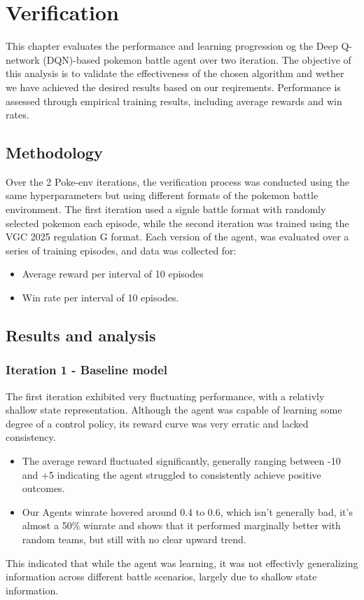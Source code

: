 \section{Verification}
\label{sec:verification}

This chapter evaluates the performance and learning progression og the Deep Q-network
(DQN)-based pokemon battle agent over two iteration. The objective of this analysis
is to validate the effectiveness of the chosen algorithm and wether we have achieved
the desired results based on our reqirements. Performance is assessed through empirical
training results, including average rewards and win rates.

\subsection{Methodology}
Over the 2 Poke-env iterations, the verification process was conducted using the same hyperparameters
but using different formats of the pokemon battle environment.
The first iteration used a signle battle format with randomly selected pokemon each
episode, while the second iteration was trained using the VGC 2025 regulation G format.
Each version of the agent, was evaluated over a series of training episodes, and data
was collected for:
\begin{itemize}
    \item Average reward per interval of 10 episodes
    \item Win rate per interval of 10 episodes.
\end{itemize}

\subsection{Results and analysis}
\subsubsection{Iteration 1 - Baseline model}
The first iteration exhibited very fluctuating performance, with a relativly shallow
state representation. Although the agent was capable of learning some degree of a control
policy, its reward curve was very erratic and lacked consistency.
\begin{itemize}
    \item The average reward fluctuated significantly, generally ranging between -10 and +5
          indicating the agent struggled to consistently achieve positive outcomes.
    \item Our Agents winrate hovered around 0.4 to 0.6, which isn't generally bad, it's almost a 50\% winrate
          and shows that it performed marginally better with random teams, but still with no clear upward trend.
\end{itemize}
This indicated that while the agent was learning, it was not effectivly generalizing
information across different battle scenarios, largely due to shallow state information.

